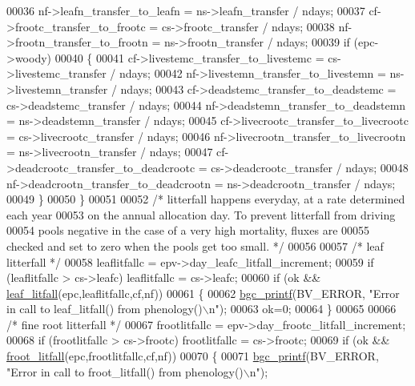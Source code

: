 \begin{DoxyCode}
00036             nf->leafn\_transfer\_to\_leafn = ns->leafn\_transfer / ndays;
00037             cf->frootc\_transfer\_to\_frootc = cs->frootc\_transfer / ndays;
00038             nf->frootn\_transfer\_to\_frootn = ns->frootn\_transfer / ndays;
00039             \textcolor{keywordflow}{if} (epc->woody)
00040             \{
00041                 cf->livestemc\_transfer\_to\_livestemc = cs->livestemc\_transfer / ndays;
00042                 nf->livestemn\_transfer\_to\_livestemn = ns->livestemn\_transfer / ndays;
00043                 cf->deadstemc\_transfer\_to\_deadstemc = cs->deadstemc\_transfer / ndays;
00044                 nf->deadstemn\_transfer\_to\_deadstemn = ns->deadstemn\_transfer / ndays;
00045                 cf->livecrootc\_transfer\_to\_livecrootc = cs->livecrootc\_transfer / ndays;
00046                 nf->livecrootn\_transfer\_to\_livecrootn = ns->livecrootn\_transfer / ndays;
00047                 cf->deadcrootc\_transfer\_to\_deadcrootc = cs->deadcrootc\_transfer / ndays;
00048                 nf->deadcrootn\_transfer\_to\_deadcrootn = ns->deadcrootn\_transfer / ndays;
00049             \}
00050         \}
00051 
00052         \textcolor{comment}{/* litterfall happens everyday, at a rate determined each year}
00053 \textcolor{comment}{        on the annual allocation day.  To prevent litterfall from driving}
00054 \textcolor{comment}{        pools negative in the case of a very high mortality, fluxes are}
00055 \textcolor{comment}{        checked and set to zero when the pools get too small. */}
00056 
00057         \textcolor{comment}{/* leaf litterfall */}
00058         leaflitfallc = epv->day\_leafc\_litfall\_increment;
00059         \textcolor{keywordflow}{if} (leaflitfallc > cs->leafc) leaflitfallc = cs->leafc;
00060         \textcolor{keywordflow}{if} (ok && \hyperlink{phenology_8c_a6400c77226b2dd734e44323a5a2c9d64}{leaf\_litfall}(epc,leaflitfallc,cf,nf))
00061         \{
00062             \hyperlink{bgc__io_8c_af287cce6e2aede1ce337de9319e80d0d}{bgc\_printf}(BV\_ERROR, \textcolor{stringliteral}{"Error in call to leaf\_litfall() from phenology()\(\backslash\)n"});
00063             ok=0;
00064         \}
00065 
00066         \textcolor{comment}{/* fine root litterfall */}
00067         frootlitfallc = epv->day\_frootc\_litfall\_increment;
00068         \textcolor{keywordflow}{if} (frootlitfallc > cs->frootc) frootlitfallc = cs->frootc;
00069         \textcolor{keywordflow}{if} (ok && \hyperlink{phenology_8c_ac9d84f39b7db5a7498a0ac0f9edffd1f}{froot\_litfall}(epc,frootlitfallc,cf,nf))
00070         \{
00071             \hyperlink{bgc__io_8c_af287cce6e2aede1ce337de9319e80d0d}{bgc\_printf}(BV\_ERROR, \textcolor{stringliteral}{"Error in call to froot\_litfall() from phenology()\(\backslash\)n"});

\end{DoxyCode}
